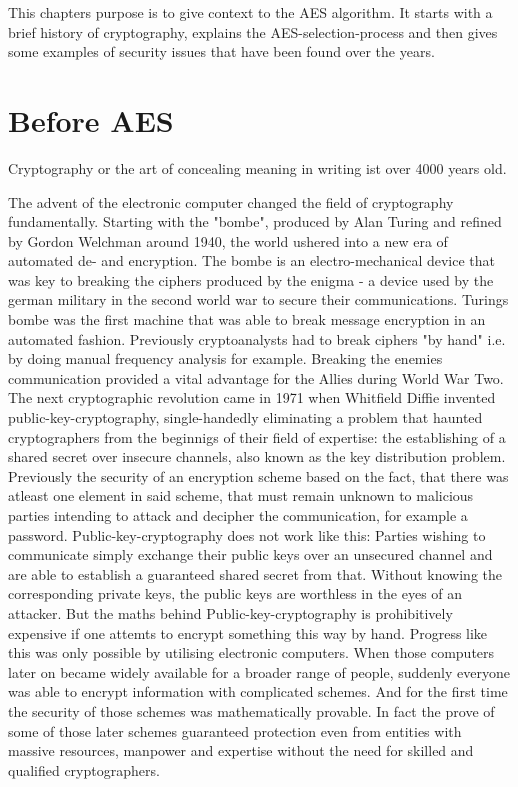 This chapters purpose is to give context to the AES algorithm. It starts with a brief history of cryptography, explains the AES-selection-process and then gives some examples of security issues that have been found over the years.


\section{Before AES}
\label{ch:before-aes}
Cryptography or the art of concealing meaning in writing ist over 4000 years old.

The advent of the electronic computer changed the field of cryptography fundamentally. Starting with the "bombe", produced by Alan Turing and refined by Gordon Welchman around 1940, the world ushered into a new era of automated de- and encryption. 
The bombe is an electro-mechanical device that was key to breaking the ciphers produced by the enigma - a device used by the german military in the second world war to secure their communications. Turings bombe was the first machine that was able to break message encryption in an automated fashion. Previously cryptoanalysts had to break ciphers "by hand" i.e. by doing manual frequency analysis for example. Breaking the enemies communication provided a vital advantage for the Allies during World War Two.
The next cryptographic revolution came in 1971 when Whitfield Diffie invented public-key-cryptography, single-handedly eliminating a problem that haunted cryptographers from the beginnigs of their field of expertise: the establishing of a shared secret over insecure channels, also known as the key distribution problem. Previously the security of an encryption scheme based on the fact, that there was atleast one element in said scheme, that must remain unknown to malicious parties intending to attack and decipher the communication, for example a password. Public-key-cryptography does not work like this: Parties wishing to communicate simply exchange their public keys over an unsecured channel and are able to establish a guaranteed shared secret from that. Without knowing the corresponding private keys, the public keys are worthless in the eyes of an attacker. But the maths behind Public-key-cryptography is prohibitively expensive if one attemts to encrypt something this way by hand. Progress like this was only possible by utilising electronic computers.
When those computers later on became widely available for a broader range of people, suddenly everyone was able to encrypt information with complicated schemes. And for the first time the security of those schemes was mathematically provable. In fact the prove of some of those later schemes guaranteed protection even from entities with massive resources, manpower and expertise without the need for skilled and qualified cryptographers. 
